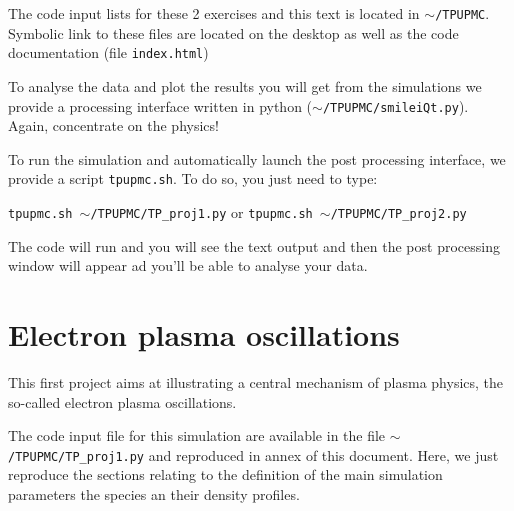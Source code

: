 \documentclass[11pt,a4paper]{article}
\begin{document}
The code input lists for these 2 exercises and this text is located in \texttt{$\sim$/TPUPMC}. Symbolic link to these files are located on the desktop as well as the code documentation (file \texttt{index.html})

To analyse the data and plot the results you will get from the simulations we provide a processing interface written in python (\texttt{$\sim$/TPUPMC/smileiQt.py}). Again, concentrate on the physics!

To run the simulation and automatically launch the post processing interface, we provide a script \texttt{tpupmc.sh}. To do so, you just need to type:

\texttt{tpupmc.sh $\sim$/TPUPMC/TP\_proj1.py}
or 
\texttt{tpupmc.sh $\sim$/TPUPMC/TP\_proj2.py}

The code will run and you will see the text output and then the post processing window will appear ad you'll be able to analyse your data. 

\begin{ExerciseList}
\vspace{0.5cm}
  \Exercise[title={Normalizations},label={ex1}] \leavevmode

\end{ExerciseList}


\newpage
\section{Electron plasma oscillations}\label{proj1}

This first project aims at illustrating a central mechanism of plasma physics, the so-called electron plasma oscillations.

The code input file for this simulation are available in the file \texttt{$\sim$/TPUPMC/TP\_proj1.py} and reproduced in annex of this document.
Here, we just reproduce the sections relating to the definition of the main simulation parameters the species an their density profiles.
\end{document}
